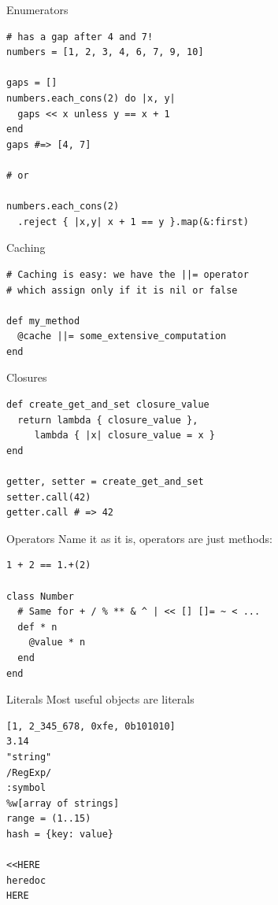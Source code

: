 \documentclass[10pt]{beamer}
\begin{document}
\begin{frame}[fragile]{Enumerators}
\begin{lstlisting}
# has a gap after 4 and 7!
numbers = [1, 2, 3, 4, 6, 7, 9, 10]

gaps = []
numbers.each_cons(2) do |x, y|
  gaps << x unless y == x + 1
end
gaps #=> [4, 7]

# or

numbers.each_cons(2)
  .reject { |x,y| x + 1 == y }.map(&:first)
\end{lstlisting}
\end{frame}

\begin{frame}[fragile]{Caching}
\begin{lstlisting}
# Caching is easy: we have the ||= operator
# which assign only if it is nil or false

def my_method
  @cache ||= some_extensive_computation
end
\end{lstlisting}
\end{frame}

\begin{frame}[fragile]{Closures}
\begin{lstlisting}
def create_get_and_set closure_value
  return lambda { closure_value },
     lambda { |x| closure_value = x }
end
 
getter, setter = create_get_and_set
setter.call(42)
getter.call # => 42
\end{lstlisting}
\end{frame}

\begin{frame}[fragile]{Operators}
Name it as it is, operators are just methods:
\begin{lstlisting}
1 + 2 == 1.+(2)

class Number
  # Same for + / % ** & ^ | << [] []= ~ < ...
  def * n
    @value * n
  end
end
\end{lstlisting}
\end{frame}

\begin{frame}[fragile]{Literals}
Most useful objects are literals
\begin{lstlisting}[xleftmargin=20pt]
[1, 2_345_678, 0xfe, 0b101010]
3.14
"string"
/RegExp/
:symbol
%w[array of strings]
range = (1..15)
hash = {key: value}

<<HERE
heredoc
HERE
\end{lstlisting}
\end{frame}
\end{document}
